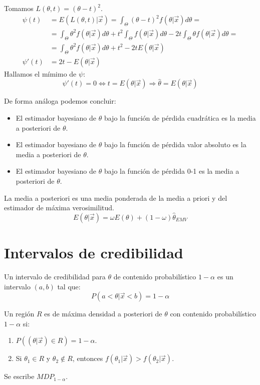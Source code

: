 \begin{example}
    Tomamos $L(\theta, t) = (\theta-t)^2$.
    \begin{align*}
        \psi(t)  & = E(L(\theta, t)|\vec{x}) = \int_\Theta (\theta-t)^2f(\theta|\vec{x})d\theta =                                                             \\
                 & = \int_\Theta \theta^2f(\theta|\vec{x})d\theta + t^2\int_\Theta f(\theta|\vec{x})d\theta - 2t\int_\Theta \theta f(\theta|\vec{x})d\theta = \\
                 & = \int_\Theta \theta^2f(\theta|\vec{x})d\theta + t^2 - 2tE(\theta|\vec{x})                                                                 \\
        \psi'(t) & = 2t - E(\theta|\vec{x})
    \end{align*}
    Hallamos el mímimo de $\psi$:
    $$\psi'(t) = 0 \Leftrightarrow t = E(\theta|\vec{x}) \Rightarrow \hat{\theta} = E(\theta|\vec{x})$$
\end{example}

De forma análoga podemos concluir:
\begin{itemize}
    \item El estimador bayesiano de $\theta$ bajo la función de pérdida cuadrática es la media a posteriori de $\theta$.
    \item El estimador bayesiano de $\theta$ bajo la función de pérdida valor absoluto es la media a posteriori de $\theta$.
    \item El estimador bayesiano de $\theta$ bajo la función de pérdida 0-1 es la media a posteriori de $\theta$.
\end{itemize}

\begin{remark}
    La media a posteriori es una media ponderada de la media a priori y del estimador de máxima verosimilitud.
    $$E(\theta|\vec{x}) = \omega E(\theta) + (1-\omega)\hat{\theta}_{EMV}$$
\end{remark}

\section{Intervalos de credibilidad}
Un intervalo de credibilidad para $\theta$ de contenido probabilístico $1-\alpha$ es un intervalo $(a, b)$ tal que:
$$P(a < \theta|\vec{x} < b) = 1-\alpha$$

\begin{definition}
    Un región $R$ es de máxima densidad a posteriori de $\theta$ con contenido probabilístico $1-\alpha$ si:
    \begin{enumerate}
        \item $P((\theta|\vec{x}) \in R) = 1-\alpha$.
        \item Si $\theta_1 \in R$ y $\theta_2 \notin R$, entonces $f(\theta_1|\vec{x}) > f(\theta_2|\vec{x})$.
    \end{enumerate}
    Se escribe $MDP_{1-\alpha}$.
\end{definition}

